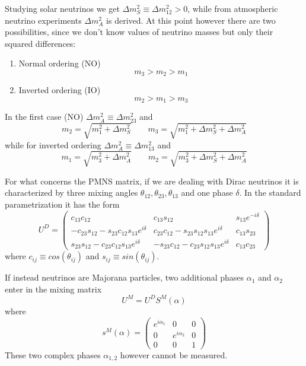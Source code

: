 \documentclass{subnucbo}
\begin{document}
Studying solar neutrinos we get $\Delta m_S^2\equiv\Delta m_{12}^2>0$, while from atmospheric neutrino experiments $\Delta m_A^2$ is derived.
At this point however there are two possibilities, since we don't know values of neutrino masses but only their squared differences:
\begin{enumerate}
\item Normal ordering (NO)
\begin{equation}
m_3>m_2>m_1
\end{equation}
\item Inverted ordering (IO)
\begin{equation}
m_2>m_1>m_3
\end{equation}
\end{enumerate}
In the first case (NO) $\Delta m_A^2\equiv\Delta m_{23}^2$ and
\begin{equation}
m_2=\sqrt{m_1^2+\Delta m_S^2} \qquad m_3=\sqrt{m_1^2+\Delta m_S^2+\Delta m_A^2}
\end{equation}
while for inverted ordering $\Delta m_A^2\equiv\Delta m_{13}^2$ and
\begin{equation}
m_1=\sqrt{m_3^2+\Delta m_A^2} \qquad m_2=\sqrt{m_3^2+\Delta m_S^2+\Delta m_A^2}
\end{equation}

For what concerns the PMNS matrix, if we are dealing with Dirac neutrinos it is characterized by three mixing angles $\theta_{12}, \theta_{23}, \theta_{13}$ and one phase $\delta$. In the standard parametrization it has the form
\begin{equation}
U^D=\begin{pmatrix}c_{13}c_{12}&c_{13}s_{12}&s_{13}e^{-i\delta}\\-c_{23}s_{12}-s_{23}c_{12}s_{13}e^{i\delta}&c_{23}c_{12}-s_{23}s_{12}s_{13}e^{i\delta}&c_{13}s_{23}\\s_{23}s_{12}-c_{23}c_{12}s_{13}e^{i\delta}&-s_{23}c_{12}-c_{23}s_{12}s_{13}e^{i\delta}&c_{13}c_{23}\end{pmatrix}
\end{equation}
where $c_{ij}\equiv cos(\theta_{ij})$ and $s_{ij}\equiv sin(\theta_{ij})$.

If instead neutrinos are Majorana particles, two additional phases $\alpha_1$ and $\alpha_2$ enter in the mixing matrix
\begin{equation}
U^M=U^DS^M(\alpha)
\end{equation}
where
\begin{equation}
s^M(\alpha)=\begin{pmatrix}e^{i\alpha_1}&0&0\\0&e^{i\alpha_2}&0\\0&0&1\end{pmatrix}
\end{equation}
These two complex phases $\alpha_{1,2}$ however cannot be measured.
\end{document}
